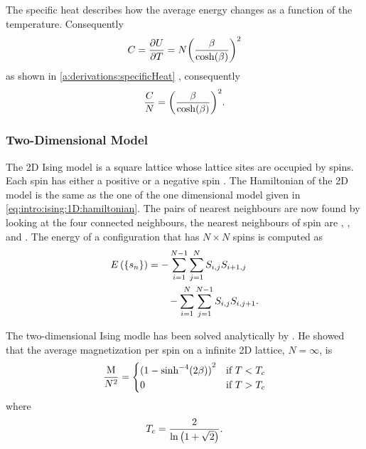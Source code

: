 	The specific heat describes how the average energy changes as a function of the temperature. Consequently
	\begin{equation*}
		C = \frac{\partial U}{\partial T} = N {\left(\frac{\beta}{\cosh(\beta)}\right)}^{2}
	\end{equation*}
	as shown in \cref{a:derivations:specificHeat} \cite{warkHandout}, consequently
	\begin{equation*}
	 	\frac{C}{N} = {\left(\frac{\beta}{\cosh(\beta)}\right)}^2.
	 \end{equation*}
 
\subsubsection{Two-Dimensional Model}
	\label{sss:intro:ising:2D}
	The 2D Ising model is a square lattice whose lattice sites are occupied by spins. Each spin has either a positive or a negative spin \cite{kenzel1997physics}. The Hamiltonian of the 2D model is the same as the one of the one dimensional model given in \cref{eq:intro:ising:1D:hamiltonian}. The pairs of nearest neighbours are now found by looking at the four connected neighbours, \ie the nearest neighbours of spin  are , ,  and . The energy of a configuration  that has $N \times N$ spins is computed as
	\begin{equation*}
		\begin{split}
		E\left(\left\{s_{n}\right\} \right) 
			& = - \sum_{i = 1}^{N - 1}\sum_{j = 1}^{N} S_{i,j}S_{i+1,j}\\
			&\quad\quad - \sum_{i = 1}^{N}\sum_{j = 1}^{N - 1} S_{i,j} S_{i, j+1}.
		\end{split}
	\end{equation*}

	The two-dimensional Ising modle has been solved analytically by \textcite{onsager1944crystal}. He showed that the average magnetization per spin on a infinite 2D lattice, \ie $N = \infty$, is
	\begin{equation}
		\label{eq:intro:ising:2d:energy}
		\frac{\mathrm{M}}{N^2} = \begin{cases}
			{(1 - {\sinh}^{-4}(2\beta))}^2 & \text{if } T < T_{c}\\
			0 								& \text{if } T > T_{c}
		\end{cases}
	\end{equation}
	where
	\begin{equation*}
		T_{c} = \frac{2}{\ln \left(1 + \sqrt{2}\right)}.
	\end{equation*}

